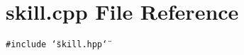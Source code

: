 \section{skill.cpp File Reference}
\label{skill_8cpp}
{\tt \#include \char`\"{}skill.hpp\char`\"{}}\par
